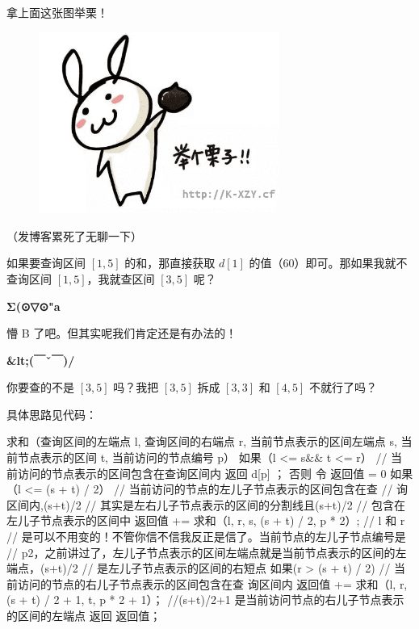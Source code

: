 拿上面这张图举栗！

\begin{figure}[htbp]
\centering
\includegraphics[width=0.7\textwidth]{docs/ds/images/segt7.png} 

\end{figure}

（发博客累死了无聊一下）

如果要查询区间 $[1,5]$ 的和，那直接获取 $d[1]$ 的值（$60$）即可。那如果我就不查询区间 $[1,5]$，我就查区间 $[3,5]$ 呢？

\textbf{Σ(⊙▽⊙"a}

懵 B 了吧。但其实呢我们肯定还是有办法的！

\textbf{\&lt;(￣ˇ￣)/}

你要查的不是 $[3,5]$ 吗？我把 $[3,5]$ 拆成 $[3,3]$ 和 $[4,5]$ 不就行了吗？

具体思路见代码：

\begin{cppcode}
求和（查询区间的左端点 l, 查询区间的右端点 r, 当前节点表示的区间左端点 s,
    当前节点表示的区间 t, 当前访问的节点编号 p） {
  如果（l <= s&& t <= r）  // 当前访问的节点表示的区间包含在查询区间内
      {返回 d[p] ；} 否则 {
    令 返回值 = 0 如果（l <=
                (s + t) / 2）  // 当前访问的节点的左儿子节点表示的区间包含在查
                               // 询区间内,(s+t)/2
                               // 其实是左右儿子节点表示的区间的分割线且(s+t)/2
                               // 包含在左儿子节点表示的区间中
    {
      返回值 += 求和（l, r, s, (s + t) / 2,
          p * 2）;  // l 和 r
                    // 是可以不用变的！不管你信不信我反正是信了。当前节点的左儿子节点编号是
                    // p2，之前讲过了，左儿子节点表示的区间左端点就是当前节点表示的区间的左端点，(s+t)/2
                    // 是左儿子节点表示的区间的右短点
    }
    如果(r >
         (s + t) / 2)  // 当前访问的节点的右儿子节点表示的区间包含在查 询区间内
    {
        返回值 += 求和（l, r, (s + t) / 2 + 1, t,
        p * 2 + 1）；  //(s+t)/2+1 是当前访问节点的右儿子节点表示的区间的左端点
    } 返回 返回值；
  }
}
\end{cppcode}

